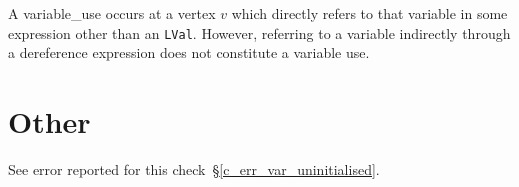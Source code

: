 A \gls{variable_use} occurs at a vertex $v$ which directly refers to that variable in some expression other than an \lstinline{LVal}.  However, referring to a variable indirectly through a dereference expression does not constitute a variable use.

\section{Other}

See error reported for this check~\S\ref{c_err_var_uninitialised}.

